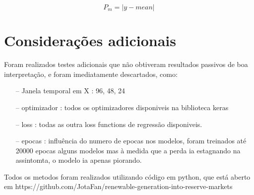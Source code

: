 \begin{equation} \label{eq:peso_media} 
    P_m = \left| y - mean \right| 
\end{equation}

\section{Considerações adicionais  \label{se:metodos_plus}}

Foram realizados testes adicionais que não obtiveram resultados passivos de boa interpretação, e foram imediatamente descartados, como:

\begin{itemize}
    \item[--] Janela temporal em X : 96, 48, 24
    \item[--] optimizador : todos os optimizadores disponiveis na biblioteca keras
    \item[--] loss : todas as outra loss functions de regressão disponiveis.
    \item[--] epocas : influência do numero de epocas nos modelos, foram treinados até 20000 epocas alguns modelos mas à medida que a perda ia estagnando na assintomta, o modelo ia apenas piorando.
\end{itemize}


Todos os metodos foram realizados utilizando código em python, que está aberto em https://github.com/JotaFan/renewable-generation-into-reserve-markets
